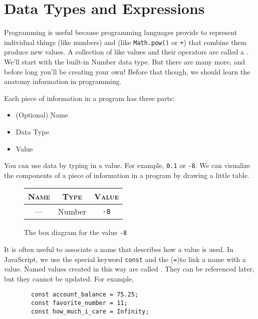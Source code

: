 \documentclass{amsart}
\begin{document}
\section{Data Types and Expressions}
Programming is useful because programming languages provide  to represent individual things (like numbers) and  (like \texttt{Math.pow()} or \texttt{+}) that combine them produce new values. A collection of like values and their operators are called a . We'll start with the built-in \textsf{Number} data type. But there are many more, and before long you'll be creating your own! Before that though, we should learn the anatomy information in programming.

Each piece of information in a program has three parts:

\begin{itemize}
  \item (Optional) Name
  \item Data Type
  \item Value
\end{itemize}


You can use data by typing in a value. For example, \texttt{0.1} or \texttt{-8}. We can visualize the components of a piece of information in a program by drawing a little table.

\begin{figure}[h]
  \color{cyan}
\begin{tabular}{|c|c|c|}
  \hline
  \textsc{Name} & \textsc{Type} & \textsc{Value}\\
  \hline
  --- & \textsf{Number} & \texttt{-8}\\
  \hline
\end{tabular}
\caption{The box diagram for the value \texttt{-8}}
\end{figure}

It is often useful to associate a name that describes how a value is used. In JavaScript, we use the special keyword {\color{cyan}\texttt{const}} and the  ({\color{cyan}\texttt{=}})to link a name with a value. Named values created in this way are called . They can be referenced later, but they cannot be updated. For example,

\begin{figure}[h]
\begin{lstlisting}
  const account_balance = 75.25;
  const favorite_number = 11;
  const how_much_i_care = Infinity;
\end{lstlisting}
\end{figure}
\end{document}
